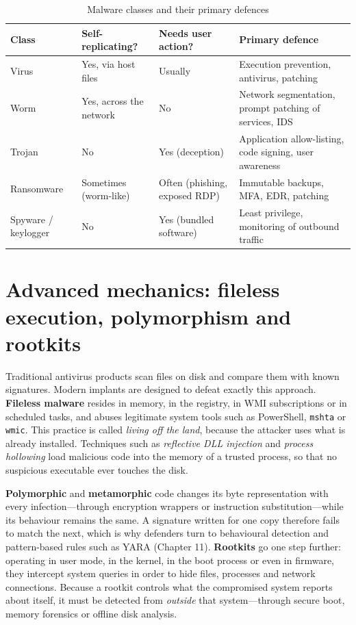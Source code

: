 \documentclass[11pt,openany]{book}
\begin{document}
\begin{table}[htbp]
  \centering\small
  \caption{Malware classes and their primary defences}
  \begin{tabularx}{\linewidth}{>{\raggedright\arraybackslash}X >{\raggedright\arraybackslash}X >{\raggedright\arraybackslash}X >{\raggedright\arraybackslash}X}
    \toprule
    \textbf{Class} & \textbf{Self-replicating?} & \textbf{Needs user action?} & \textbf{Primary defence} \\
    \midrule
    Virus & Yes, via host files & Usually & Execution prevention, antivirus, patching \\
    Worm & Yes, across the network & No & Network segmentation, prompt patching of services, IDS \\
    Trojan & No & Yes (deception) & Application allow-listing, code signing, user awareness \\
    Ransomware & Sometimes (worm-like) & Often (phishing, exposed RDP) & Immutable backups, MFA, EDR, patching \\
    Spyware / keylogger & No & Yes (bundled software) & Least privilege, monitoring of outbound traffic \\
    \bottomrule
  \end{tabularx}
\end{table}
\section{Advanced mechanics: fileless execution, polymorphism and rootkits}\label{sec:4.2}
Traditional antivirus products scan files on disk and compare them with known signatures. Modern implants are designed to defeat exactly this approach. \textbf{Fileless malware} resides in memory, in the registry, in WMI subscriptions or in scheduled tasks, and abuses legitimate system tools such as PowerShell, \texttt{mshta} or \texttt{wmic}. This practice is called \emph{living off the land}, because the attacker uses what is already installed. Techniques such as \emph{reflective DLL injection} and \emph{process hollowing} load malicious code into the memory of a trusted process, so that no suspicious executable ever touches the disk.

\textbf{Polymorphic} and \textbf{metamorphic} code changes its byte representation with every infection—through encryption wrappers or instruction substitution—while its behaviour remains the same. A signature written for one copy therefore fails to match the next, which is why defenders turn to behavioural detection and pattern-based rules such as YARA (Chapter 11). \textbf{Rootkits} go one step further: operating in user mode, in the kernel, in the boot process or even in firmware, they intercept system queries in order to hide files, processes and network connections. Because a rootkit controls what the compromised system reports about itself, it must be detected from \emph{outside} that system—through secure boot, memory forensics or offline disk analysis.
\end{document}

